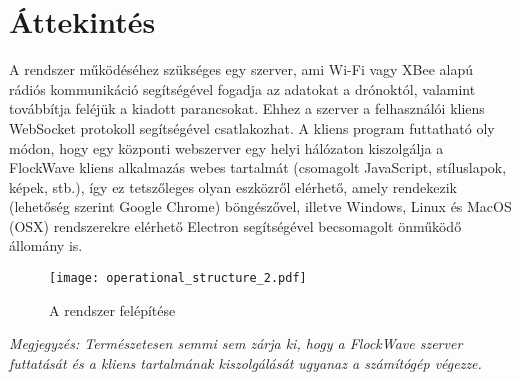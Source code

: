\section{Áttekintés}

A rendszer működéséhez szükséges egy szerver, ami Wi-Fi vagy XBee alapú rádiós
kommunikáció segítségével fogadja az adatokat a drónoktól, valamint továbbítja
feléjük a kiadott parancsokat. Ehhez a szerver a felhasználói kliens WebSocket
protokoll segítségével csatlakozhat. A kliens program futtatható oly módon, hogy
egy központi webszerver egy helyi hálózaton kiszolgálja a FlockWave kliens
alkalmazás webes tartalmát (csomagolt JavaScript, stíluslapok, képek, stb.), így
ez tetszőleges olyan eszközről elérhető, amely rendekezik (lehetőség szerint
Google Chrome) böngészővel, illetve Windows, Linux és MacOS (OSX) rendszerekre
elérhető Electron segítségével becsomagolt önműködő állomány is.

\begin{figure}[H]
  \centering
    \texttt{[image: operational\_structure\_2.pdf]}
  \caption{A rendszer felépítése}
\end{figure}

\textit{Megjegyzés: Természetesen semmi sem zárja ki, hogy a FlockWave szerver
futtatását és a kliens tartalmának kiszolgálását ugyanaz a számítógép végezze.}
